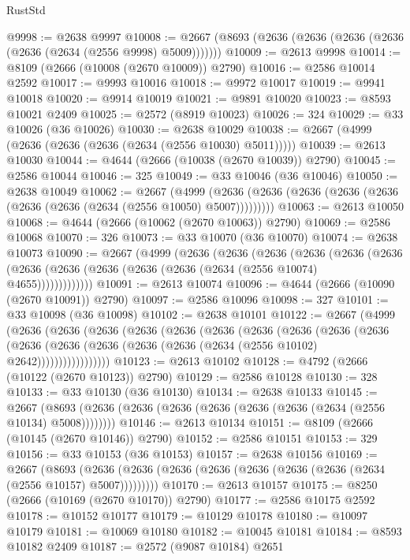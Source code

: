 \begin{lexlean}{RustStd}
\begin{coremodule}
@9998 := @2638 @9997
@10008 := @2667 (@8693 (@2636 (@2636 (@2636 (@2636 (@2636 (@2634 (@2556 @9998) @5009)))))))
@10009 := @2613 @9998
@10014 := @8109 (@2666 (@10008 (@2670 @10009)) @2790)
@10016 := @2586 @10014 @2592
@10017 := @9993 @10016
@10018 := @9972 @10017
@10019 := @9941 @10018
@10020 := @9914 @10019
@10021 := @9891 @10020
@10023 := @8593 @10021 @2409
@10025 := @2572 (@8919 @10023)
@10026 := 324
@10029 := @33 @10026 (@36 @10026)
@10030 := @2638 @10029
@10038 := @2667 (@4999 (@2636 (@2636 (@2636 (@2634 (@2556 @10030) @5011)))))
@10039 := @2613 @10030
@10044 := @4644 (@2666 (@10038 (@2670 @10039)) @2790)
@10045 := @2586 @10044
@10046 := 325
@10049 := @33 @10046 (@36 @10046)
@10050 := @2638 @10049
@10062 := @2667
    (@4999 (@2636 (@2636 (@2636 (@2636 (@2636 (@2636 (@2636 (@2634 (@2556 @10050) @5007)))))))))
@10063 := @2613 @10050
@10068 := @4644 (@2666 (@10062 (@2670 @10063)) @2790)
@10069 := @2586 @10068
@10070 := 326
@10073 := @33 @10070 (@36 @10070)
@10074 := @2638 @10073
@10090 := @2667
    (@4999
      (@2636
        (@2636
          (@2636
            (@2636
              (@2636
                (@2636 (@2636 (@2636 (@2636 (@2636 (@2636 (@2634 (@2556 @10074) @4655)))))))))))))
@10091 := @2613 @10074
@10096 := @4644 (@2666 (@10090 (@2670 @10091)) @2790)
@10097 := @2586 @10096
@10098 := 327
@10101 := @33 @10098 (@36 @10098)
@10102 := @2638 @10101
@10122 := @2667
    (@4999
      (@2636
        (@2636
          (@2636
            (@2636
              (@2636
                (@2636
                  (@2636
                    (@2636
                      (@2636
                        (@2636
                          (@2636
                            (@2636 (@2636 (@2636 (@2636 (@2634 (@2556 @10102) @2642)))))))))))))))))
@10123 := @2613 @10102
@10128 := @4792 (@2666 (@10122 (@2670 @10123)) @2790)
@10129 := @2586 @10128
@10130 := 328
@10133 := @33 @10130 (@36 @10130)
@10134 := @2638 @10133
@10145 := @2667 (@8693 (@2636 (@2636 (@2636 (@2636 (@2636 (@2636 (@2634 (@2556 @10134) @5008))))))))
@10146 := @2613 @10134
@10151 := @8109 (@2666 (@10145 (@2670 @10146)) @2790)
@10152 := @2586 @10151
@10153 := 329
@10156 := @33 @10153 (@36 @10153)
@10157 := @2638 @10156
@10169 := @2667
    (@8693 (@2636 (@2636 (@2636 (@2636 (@2636 (@2636 (@2636 (@2634 (@2556 @10157) @5007)))))))))
@10170 := @2613 @10157
@10175 := @8250 (@2666 (@10169 (@2670 @10170)) @2790)
@10177 := @2586 @10175 @2592
@10178 := @10152 @10177
@10179 := @10129 @10178
@10180 := @10097 @10179
@10181 := @10069 @10180
@10182 := @10045 @10181
@10184 := @8593 @10182 @2409
@10187 := @2572 (@9087 @10184) @2651

\end{coremodule}
\end{lexlean}

